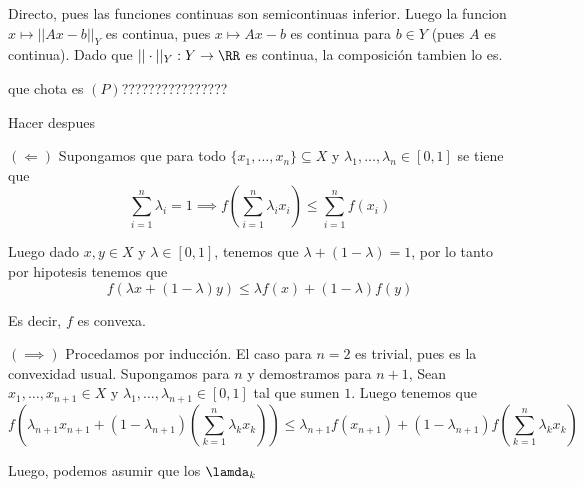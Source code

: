 \documentclass[a4paper,oneside,10.5pt]{USMArt}
\begin{document}
\begin{sol}
  Directo, pues las funciones continuas son semicontinuas inferior. Luego la funcion $x \mapsto ||Ax - b||_{Y}$
  es continua, pues $x \mapsto Ax - b$ es continua para $b \in Y$ (pues $A$ es continua). Dado que $|| \cdot ||_{Y} : Y \to \RR$ es continua, la composición tambien lo es.
\end{sol}

\begin{sol}
  que chota es $(P)$????????????????
\end{sol}

\begin{sol}
  Hacer despues
\end{sol}

\begin{sol}
  $(\Leftarrow)$ Supongamos que para todo $\{x_{1}, \dots, x_{n}\} \subseteq X$ y $\lambda_{1}, \dots, \lambda_{n} \in [0, 1]$ se tiene que
  \begin{equation*}
    \sum_{i = 1}^{n} \lambda_{i} = 1 \implies f(\sum_{i = 1}^{n} \lambda_{i} x_{i}) \leq \sum_{i = 1}^{n} f(x_{i})
  \end{equation*}

  Luego dado $x, y \in X$ y $\lambda \in [0,1]$, tenemos que $\lambda + (1 - \lambda) = 1$, por lo tanto por hipotesis
  tenemos que
  \begin{equation*}
    f(\lambda x + (1 - \lambda) y) \leq \lambda f(x) + (1 - \lambda) f(y)
  \end{equation*}

  Es decir, $f$ es convexa.

  $(\implies)$ Procedamos por inducción. El caso para $n = 2$ es trivial, pues es la convexidad usual. Supongamos para
  $n$ y demostramos para $n + 1$, Sean $x_{1}, \dots, x_{n + 1} \in X$ y $\lambda_{1}, \dots, \lambda_{n + 1} \in [0, 1]$
  tal que sumen $1$. Luego tenemos que
  \begin{equation*}
    f(\lambda_{n + 1} x_{n +1} + (1 - \lambda_{n + 1})(\sum_{k = 1}^{n} \lambda_{k} x_{k})) \leq \lambda_{n + 1}f(x_{n+1}) + (1 - \lambda_{n + 1}) f(\sum_{k = 1}^{n} \lambda_{k} x_{k})
  \end{equation*}

  Luego, podemos asumir que los $\lamda_{k}$
\end{sol}
\end{document}

